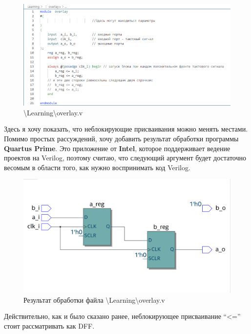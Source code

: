 \documentclass[a4paper,12pt]{article} %
\begin{document}
\begin{figure}[H]
    \centering
    \includegraphics[width=1\linewidth]{Learning/overlay.png}
    \caption{\textbackslash Learning\textbackslash overlay.v}
\end{figure}

Здесь я хочу показать, что неблокирующие присваивания можно менять местами. Помимо простых рассуждений, хочу добавить результат обработки программы \textbf{Quartus Prime}. Это приложение от \textbf{Intel}, которое поддерживает ведение проектов на Verilog, поэтому считаю, что следующий аргумент будет достаточно весомым в области того, как нужно воспринимать код Verilog.

\begin{figure}[H]
    \centering
    \includegraphics[width=1\linewidth]{Learning/RTL_overlay.png}
    \caption{Результат обработки файла \textbackslash Learning\textbackslash overlay.v}
\end{figure}

Действительно, как и было сказано ранее, неблокирующее присваивание ``<='' стоит рассматривать как DFF.
\end{document}
